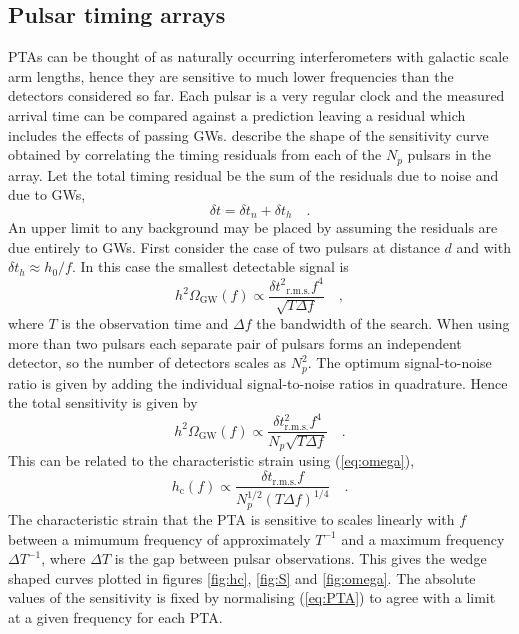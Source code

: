 \documentclass[fleqn,12pt]{iopart}
\newcommand{\sub}[1]{\ensuremath{_\mathrm{#1}}}
\begin{document}
\subsection{Pulsar timing arrays}
PTAs can be thought of as naturally occurring interferometers with galactic scale arm lengths, hence they are sensitive to much lower frequencies than the detectors considered so far.
Each pulsar is a very regular clock and the measured arrival time can be compared against a prediction leaving a residual which includes the effects of passing GWs. \citet{Sesana2008} describe the shape of the sensitivity curve obtained by correlating the timing residuals from each of the $N_{p}$ pulsars in the array. Let the total timing residual be the sum of the residuals due to noise and due to GWs,
\begin{equation} \delta t= \delta t_{n} + \delta t _{h} \quad .\end{equation}
An upper limit to any background may be placed by assuming the residuals are due entirely to GWs. First consider the case of two pulsars at distance $d$ and with $\delta t_{h}\approx h_{0}/f$. In this case the smallest detectable signal is
\begin{equation} h^{2}\Omega\sub{GW}(f) \propto \frac{\delta t^{2}\sub{r.m.s.}f^{4}}{\sqrt{T\Delta f}} \quad , \end{equation}
where $T$ is the observation time and $\Delta f$ the bandwidth of the search. When using more than two pulsars each separate pair of pulsars forms an independent detector, so the number of detectors scales as $N_{p}^{2}$. The optimum signal-to-noise ratio is given by adding the individual signal-to-noise ratios in quadrature. Hence the total sensitivity is given by
\begin{equation} h^{2}\Omega_{\textrm{GW}}(f) \propto \frac{\delta t^{2}_{\textrm{r.m.s.}}f^{4}}{N_{p}\sqrt{T\Delta f}} \quad . \end{equation}
This can be related to the characteristic strain using (\ref{eq:omega}),
\begin{equation}\label{eq:PTA} h\sub{c}(f) \propto \frac{\delta t_{\textrm{r.m.s.}}f}{N_{p}^{1/2}\left( T\Delta f \right)^{1/4}} \quad . \end{equation}
The characteristic strain that the PTA is sensitive to scales linearly with $f$ between a mimumum frequency of approximately $T^{-1}$ and a maximum frequency $\Delta T ^{-1}$, where $\Delta T$ is the gap between pulsar observations. This gives the wedge shaped curves plotted in figures \ref{fig:hc}, \ref{fig:S} and \ref{fig:omega}. The absolute values of the sensitivity is fixed by normalising (\ref{eq:PTA}) to agree with a limit at a given frequency for each PTA.
\end{document}
